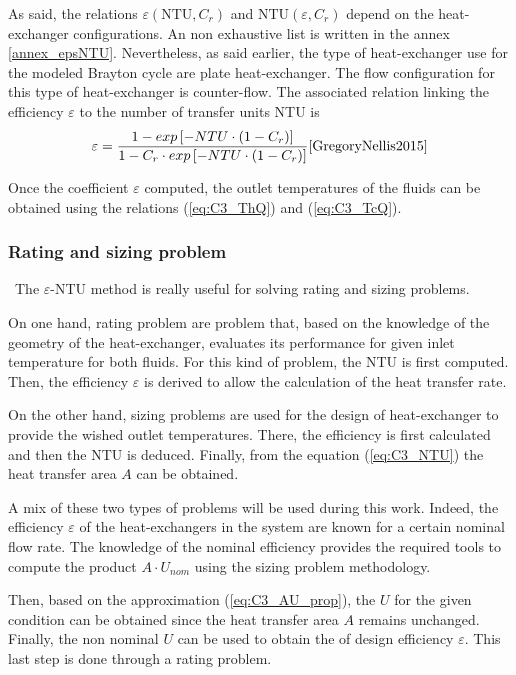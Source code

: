 As said, the relations $\varepsilon(\text{NTU},C_r)$ and $\text{NTU}(\varepsilon,C_r)$ depend on the heat-exchanger configurations. An non exhaustive list is written in the annex \ref{annex_epsNTU}\citep{GregoryNellis2015}. Nevertheless, as said earlier, the type of heat-exchanger use for the modeled Brayton cycle are plate heat-exchanger. The flow configuration for this type of heat-exchanger is counter-flow. The associated relation linking the efficiency $\varepsilon$ to the number of transfer units  NTU is 
\begin{equation}
\varepsilon = \frac{1 - exp\left[-NTU\cdot \left(1 - C_r\right)\right]}{1 - C_r\cdot exp\left[-NTU\cdot \left(1 - C_r\right)\right]}\citep{GregoryNellis2015}
\end{equation}

Once the coefficient $\varepsilon$ computed, the outlet temperatures of the fluids can be obtained using the relations (\ref{eq:C3_ThQ}) and (\ref{eq:C3_TcQ}).

\subsubsection{Rating and sizing problem}
\quad\, The $\varepsilon$-NTU method is really useful for solving rating and sizing problems.

On one hand, rating problem are problem that, based on the knowledge of the geometry of the heat-exchanger, evaluates its performance for given inlet temperature for both fluids. For this kind of problem, the NTU is first computed. Then, the efficiency $\varepsilon$ is derived to allow the calculation of the heat transfer rate.

On the other hand, sizing problems are used for the design of heat-exchanger to provide the wished outlet temperatures. There, the efficiency is first calculated and then the NTU is deduced. Finally, from the equation (\ref{eq:C3_NTU}) the heat transfer area $A$ can be obtained\citep{Ngendakumana2018}.

A mix of these two types of problems will be used during this work. Indeed, the efficiency $\varepsilon$ of the heat-exchangers in the system are known for a certain nominal flow rate.    The knowledge of the nominal efficiency provides the required tools to compute the product $A\cdot U_{nom}$ using the sizing problem methodology. 

Then, based on the approximation (\ref{eq:C3_AU_prop}), the $U$ for the given condition can be obtained since the heat transfer area $A$ remains unchanged. Finally, the non nominal $U$ can be used to obtain the of design efficiency $\varepsilon$. This last step is done through a rating problem.
\newpage
